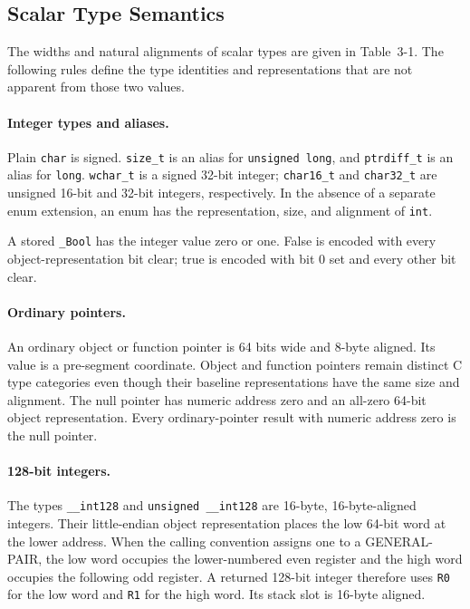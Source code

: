 \documentclass[10pt,twoside]{article}
\begin{document}
\subsection{Scalar Type Semantics}
The widths and natural alignments of scalar types are given in
Table~3-1. The following rules define the type identities and representations
that are not apparent from those two values.

\paragraph{Integer types and aliases.}
Plain \texttt{char} is signed. \texttt{size\_t} is an alias for
\texttt{unsigned long}, and \texttt{ptrdiff\_t} is an alias for
\texttt{long}. \texttt{wchar\_t} is a signed 32-bit integer;
\texttt{char16\_t} and \texttt{char32\_t} are unsigned 16-bit and 32-bit
integers, respectively. In the absence of a separate enum extension, an enum
has the representation, size, and alignment of \texttt{int}.

A stored \texttt{\_Bool} has the integer value zero or one. False is encoded
with every object-representation bit clear; true is encoded with bit 0 set and
every other bit clear.

\paragraph{Ordinary pointers.}
An ordinary object or function pointer is 64 bits wide and 8-byte aligned. Its
value is a pre-segment coordinate. Object and function pointers remain distinct C type categories
even though their baseline representations have the same size and alignment.
The null pointer has numeric address zero and an all-zero
64-bit object representation. Every ordinary-pointer result with numeric
address zero is the null pointer.

\paragraph{128-bit integers.}
The types \texttt{\_\_int128} and \texttt{unsigned \_\_int128} are 16-byte,
16-byte-aligned integers. Their little-endian object representation places the
low 64-bit word at the lower address. When the calling convention assigns one
to a GENERAL-PAIR, the low word occupies the lower-numbered even register and
the high word occupies the following odd register. A returned 128-bit integer
therefore uses \texttt{R0} for the low word and \texttt{R1} for the high word.
Its stack slot is 16-byte aligned.
\end{document}
